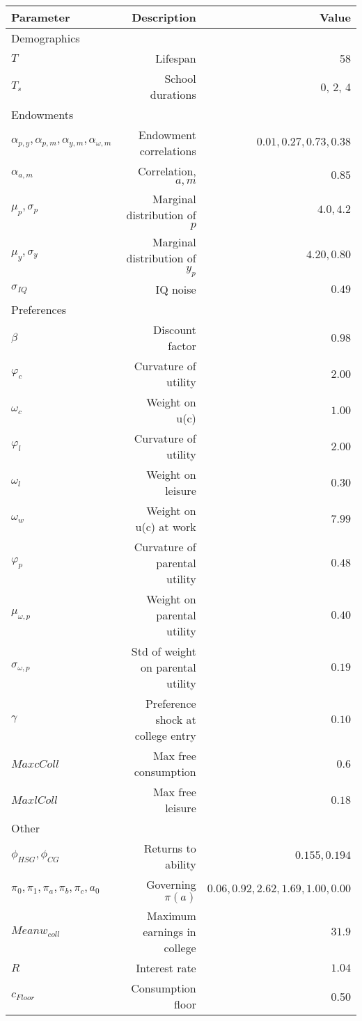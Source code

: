 \begin{tabular}{lrr}
\hline
Parameter & Description  & Value  \\ 
\hline
Demographics &   &   \\ 
$T$ & Lifespan  & 58  \\ 
$T_{s}$ & School durations  & 0, 2, 4  \\ 
Endowments &   &   \\ 
$\alpha_{p,y}, \alpha_{p,m}, \alpha_{y,m}, \alpha_{\omega,m}$ & Endowment correlations  & $0.01, 0.27, 0.73, 0.38$  \\ 
$\alpha_{a,m}$ & Correlation, $a,m$  & $0.85$  \\ 
$\mu_{p}, \sigma_{p}$ & Marginal distribution of $p$  & $4.0, 4.2$  \\ 
$\mu_{y}, \sigma_{y}$ & Marginal distribution of $y_{p}$  & $4.20, 0.80$  \\ 
$\sigma_{IQ}$ & IQ noise  & $0.49$  \\ 
Preferences &   &   \\ 
$\beta$ & Discount factor  & $0.98$  \\ 
$\varphi_{c}$ & Curvature of utility  & $2.00$  \\ 
$\omega_{c}$ & Weight on u(c)  & $1.00$  \\ 
$\varphi_{l}$ & Curvature of utility  & $2.00$  \\ 
$\omega_{l}$ & Weight on leisure  & $0.30$  \\ 
$\omega_{w}$ & Weight on u(c) at work  & $7.99$  \\ 
$\varphi_{p}$ & Curvature of parental utility  & $0.48$  \\ 
$\mu_{\omega,p}$ & Weight on parental utility  & $0.40$  \\ 
$\sigma_{\omega,p}$ & Std of weight on parental utility  & $0.19$  \\ 
$\gamma$ & Preference shock at college entry  & $0.10$  \\ 
$Max cColl$ & Max free consumption  & $0.6$  \\ 
$Max lColl$ & Max free leisure  & $0.18$  \\ 
Other &   &   \\ 
$\phi_{HSG}, \phi_{CG}$ & Returns to ability  & $0.155, 0.194$  \\ 
$\pi_{0}, \pi_{1}, \pi_{a}, \pi_{b}, \pi_{c}, a_{0}$ & Governing $\pi(a)$  & $0.06, 0.92, 2.62, 1.69, 1.00, 0.00$  \\ 
$Mean w_{coll}$ & Maximum earnings in college  & $31.9$  \\ 
$R$ & Interest rate  & $1.04$  \\ 
$c_{Floor}$ & Consumption floor  & 0.50  \\ 
\hline
\end{tabular}%
